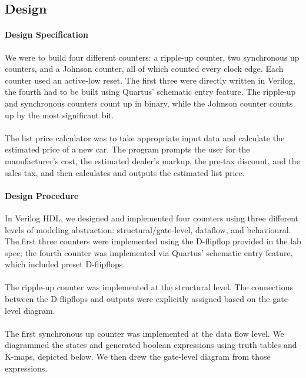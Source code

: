 \documentclass{article}
\begin{document}
  \subsection{Design}

  \paragraph{Design Specification} We were to build four different counters: a ripple-up counter, two synchronous up counters, and a Johnson counter, all of which counted every clock edge. Each counter used an active-low reset. The first three were directly written in Verilog, the fourth had to be built using Quartus' schematic entry feature. The ripple-up and synchronous counters count up in binary, while the Johnson counter counts up by the most significant bit.

  \paragraph{} The list price calculator was to take appropriate input data and calculate the estimated price of a new car. The program prompts the user for the manufacturer's cost, the estimated dealer's markup, the pre-tax discount, and the sales tax, and then calculates and outputs the estimated list price.

  \paragraph{Design Procedure} In Verilog HDL, we designed and implemented four counters using three different levels of modeling abstraction: structural/gate-level, dataflow, and behavioural. The first three counters were implemented using the D-flipflop provided in the lab spec; the fourth counter was implemented via Quartus' schematic entry feature, which included preset D-flipflops.

  

  \paragraph{}The ripple-up counter was implemented at the structural level. The connections between the D-flipflops and outputs were explicitly assigned based on the gate-level diagram.

  \paragraph{}The first synchronous up counter was implemented at the data flow level. We diagrammed the states and generated boolean expressions using truth tables and K-maps, depicted below. We then drew the gate-level diagram from those expressions.
\end{document}
